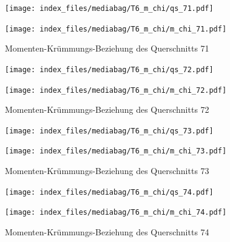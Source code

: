 \documentclass[
  11pt,
  letterpaper,
]{scrreprt}
\begin{document}
\begin{figure}[H]

\begin{minipage}{0.50\linewidth}
\texttt{[image: index\_files/mediabag/T6\_m\_chi/qs\_71.pdf]}\end{minipage}%
%
\begin{minipage}{0.50\linewidth}
\texttt{[image: index\_files/mediabag/T6\_m\_chi/m\_chi\_71.pdf]}\end{minipage}%

\caption{\label{fig-mchi_anhang}Momenten-Krümmungs-Beziehung des
Querschnitts 71}

\end{figure}%

\begin{figure}[H]

\begin{minipage}{0.50\linewidth}
\texttt{[image: index\_files/mediabag/T6\_m\_chi/qs\_72.pdf]}\end{minipage}%
%
\begin{minipage}{0.50\linewidth}
\texttt{[image: index\_files/mediabag/T6\_m\_chi/m\_chi\_72.pdf]}\end{minipage}%

\caption{\label{fig-mchi_anhang}Momenten-Krümmungs-Beziehung des
Querschnitts 72}

\end{figure}%

\begin{figure}[H]

\begin{minipage}{0.50\linewidth}
\texttt{[image: index\_files/mediabag/T6\_m\_chi/qs\_73.pdf]}\end{minipage}%
%
\begin{minipage}{0.50\linewidth}
\texttt{[image: index\_files/mediabag/T6\_m\_chi/m\_chi\_73.pdf]}\end{minipage}%

\caption{\label{fig-mchi_anhang}Momenten-Krümmungs-Beziehung des
Querschnitts 73}

\end{figure}%

\begin{figure}[H]

\begin{minipage}{0.50\linewidth}
\texttt{[image: index\_files/mediabag/T6\_m\_chi/qs\_74.pdf]}\end{minipage}%
%
\begin{minipage}{0.50\linewidth}
\texttt{[image: index\_files/mediabag/T6\_m\_chi/m\_chi\_74.pdf]}\end{minipage}%

\caption{\label{fig-mchi_anhang}Momenten-Krümmungs-Beziehung des
Querschnitts 74}

\end{figure}%
\end{document}
